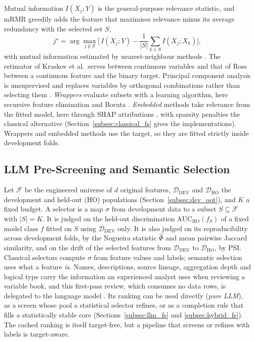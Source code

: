 \documentclass[final,5p,twocolumn]{elsarticle}
\newcommand{\Kfeat}{K}
\newcommand{\AUC}{\mathrm{AUC}}
\begin{document}
Mutual information $I(X_j;Y)$ is the general-purpose relevance statistic, and mRMR \cite{peng2005} greedily adds the feature that maximises relevance minus its average redundancy with the selected set $S$,
\begin{equation}
    j^{\star}=\arg\max_{j\notin S}\Big[\,I(X_j;Y)-\frac{1}{|S|}\sum_{k\in S} I(X_j;X_k)\Big],
    \label{eq:mrmr}
\end{equation}
with mutual information estimated by nearest-neighbour methods \cite{kraskov2004,ross2014}. The estimator of Kraskov et al.\ serves between continuous variables and that of Ross between a continuous feature and the binary target. Principal component analysis is unsupervised and replaces variables by orthogonal combinations rather than selecting them \cite{jolliffe2016}. \emph{Wrappers} evaluate subsets with a learning algorithm, here recursive feature elimination \cite{guyon2002} and Boruta \cite{kursa2010,breiman2001}. \emph{Embedded} methods take relevance from the fitted model, here through SHAP attributions \cite{lundberg2017}, with sparsity penalties \cite{tibshirani1996} the classical alternative (Section~\ref{subsec:classical_fs} gives the implementations). Wrappers and embedded methods use the target, so they are fitted strictly inside development folds.

\subsection{LLM Pre-Screening and Semantic Selection}
\label{subsec:llm_fs_background}

Let $\mathcal{F}$ be the engineered universe of $d$ original features, $\mathcal{D}_{\mathrm{DEV}}$ and $\mathcal{D}_{\mathrm{HO}}$ the development and held-out (HO) populations (Section~\ref{subsec:dev_oot}), and $\Kfeat$ a fixed budget. A selector is a map $\sigma$ from development data to a subset $S\subseteq\mathcal{F}$ with $|S|=\Kfeat$. It is judged on the held-out discrimination $\AUC_{\mathrm{HO}}(f_S)$ of a fixed model class $f$ fitted on $S$ using $\mathcal{D}_{\mathrm{DEV}}$ only. It is also judged on its reproducibility across development folds, by the Nogueira statistic $\hat\Phi$ and mean pairwise Jaccard similarity, and on the drift of the selected features from $\mathcal{D}_{\mathrm{DEV}}$ to $\mathcal{D}_{\mathrm{HO}}$, by PSI. Classical selectors compute $\sigma$ from feature values and labels; semantic selection uses what a feature \emph{is}. Names, descriptions, source lineage, aggregation depth and logical type carry the information an experienced analyst uses when reviewing a variable book, and this first-pass review, which consumes no data rows, is delegated to the language model \cite{jeong2025,li2025sigkdd}. Its ranking can be used directly (\emph{pure LLM}), as a screen whose pool a statistical selector refines, or as a completion rule that fills a statistically stable core (Sections~\ref{subsec:llm_fs} and \ref{subsec:hybrid_fs}). The cached ranking is itself target-free, but a pipeline that screens or refines with labels is target-aware.
\end{document}
